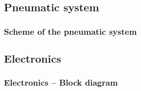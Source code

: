 \documentclass[xcolor=dvipsnames]{beamer}%
\begin{document}
\subsection{Pneumatic system} %
\begin{frame} %
\frametitle{Scheme of the pneumatic system}
\end{frame}%


\subsection{Electronics} %
\begin{frame} %
\frametitle{Electronics -- Block diagram}


\centering
\end{frame}%
\end{document}
